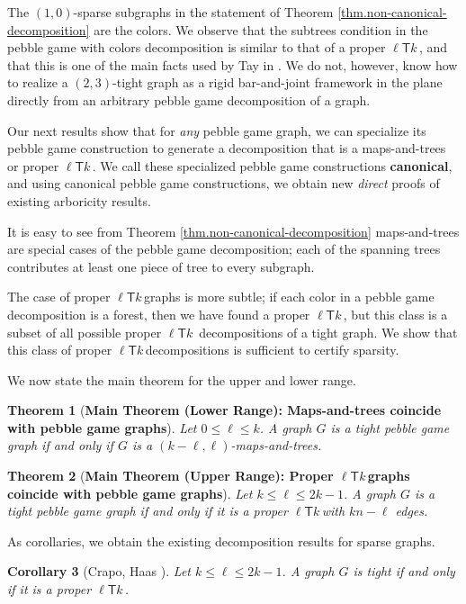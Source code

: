 \documentclass[11pt]{article}
\newcommand{\ellteekay}{\ensuremath{\ell{\mathsf T}k}\,}
\newtheorem{theorem}{Theorem}
\newtheorem{corollary}[theorem]{Corollary}
\newcommand{\refthm}[1]{Theorem \ref{thm.#1}}
\newcommand{\labelthm}[1]{\label{thm.#1}}
\newcommand{\labelcor}[1]{\label{cor.#1}}
\begin{document}
The $(1,0)$-sparse subgraphs in the statement of \refthm{non-canonical-decomposition} 
are the colors.  We observe that the subtrees condition in the pebble game 
with colors decomposition is similar to that of a proper \ellteekay, and that this is 
one of the main facts used by Tay in \cite{Tay93}.  We do not, however, know how to 
realize a $(2,3)$-tight graph as a rigid bar-and-joint framework in the plane directly
from an arbitrary pebble game decomposition of a graph. 

Our next
results show that for {\it any} pebble game graph, we can specialize its pebble game
construction to generate a decomposition that is a maps-and-trees or proper \ellteekay.
We call these specialized pebble game constructions {\bf canonical}, and using 
canonical pebble game constructions, we obtain new {\it direct} proofs of 
existing arboricity results.

It is easy to see from \refthm{non-canonical-decomposition}	 maps-and-trees 
 are special cases of the pebble game decomposition; each of the 
spanning trees contributes at least one piece of tree to every subgraph.  

The case of proper \ellteekay graphs is more subtle; if each color in a 
pebble game decomposition is a forest, then we have found a proper
\ellteekay, but this class is a subset of all possible proper \ellteekay
decompositions of a tight graph.  We show that this class of proper 
\ellteekay decompositions is sufficient to certify sparsity.

We now state the main theorem for the upper and lower range.

\begin{theorem}[{\bf Main Theorem (Lower Range): Maps-and-trees coincide with pebble game graphs}]
	\labelthm{canonical-decomposition-I} Let $0\le \ell\le k$. A graph $G$ is a tight pebble game graph if and only if $G$ is a $(k-\ell,\ell)$-maps-and-trees. 
\end{theorem}

\begin{theorem}[{\bf Main Theorem (Upper Range): Proper \ellteekay graphs coincide with pebble game graphs}]
	Let $k\le \ell\le 2k-1$. A graph $G$ is a tight pebble game graph if and only if it is a proper \ellteekay with $kn-\ell$ edges. \labelthm{canonical-decomposition-II} 
\end{theorem}
	
As corollaries, we obtain the existing decomposition results for sparse graphs.
\begin{corollary}
	[Crapo, Haas \cite{haas:2002,Cr96}] 
	\labelcor{t-a-t-equals-tight}
	Let $k\le \ell\le 2k-1$. A graph $G$ is tight if and only if it is a proper \ellteekay. 
\end{corollary}
	
\end{document}

